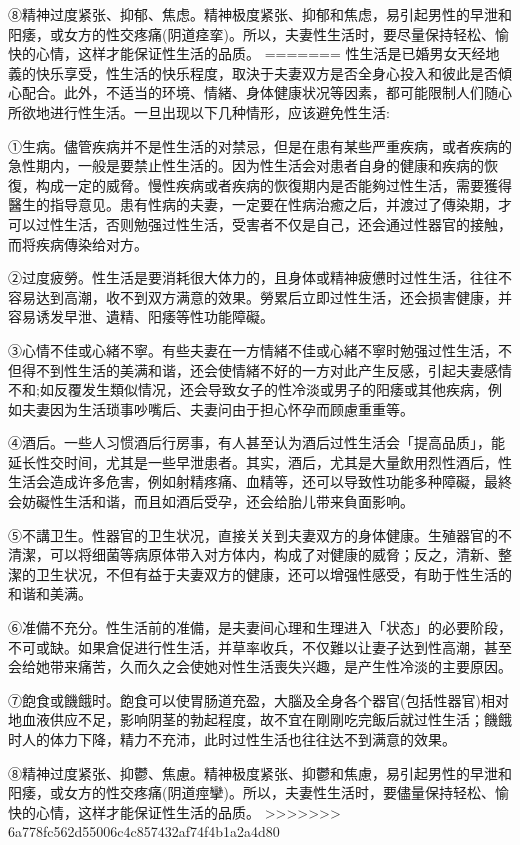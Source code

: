 \documentclass[12pt,UTF8]{ctexbook}
\begin{document}
⑧精神过度紧张、抑郁、焦虑。精神极度紧张、抑郁和焦虑，易引起男性的早泄和阳痿，或女方的性交疼痛(阴道痉挛)。所以，夫妻性生活时，要尽量保持轻松、愉快的心情，这样才能保证性生活的品质。
=======
性生活是已婚男女天经地義的快乐享受，性生活的快乐程度，取決于夫妻双方是否全身心投入和彼此是否傾心配合。此外，不适当的环境、情緒、身体健康状况等因素，都可能限制人们随心所欲地进行性生活。一旦出现以下几种情形，应该避免性生活:

①生病。儘管疾病并不是性生活的对禁忌，但是在患有某些严重疾病，或者疾病的急性期内，一般是要禁止性生活的。因为性生活会对患者自身的健康和疾病的恢復，构成一定的威脅。慢性疾病或者疾病的恢復期内是否能夠过性生活，需要獲得醫生的指导意见。患有性病的夫妻，一定要在性病治癒之后，并渡过了傳染期，才可以过性生活，否则勉强过性生活，受害者不仅是自己，还会通过性器官的接触，而将疾病傳染给对方。

②过度疲勞。性生活是要消耗很大体力的，且身体或精神疲憊时过性生活，往往不容易达到高潮，收不到双方满意的效果。勞累后立即过性生活，还会损害健康，并容易诱发早泄、遺精、阳痿等性功能障礙。

③心情不佳或心緒不寧。有些夫妻在一方情緒不佳或心緒不寧时勉强过性生活，不但得不到性生活的美满和谐，还会使情緒不好的一方对此产生反感，引起夫妻感情不和;如反覆发生類似情况，还会导致女子的性冷淡或男子的阳痿或其他疾病，例如夫妻因为生活琐事吵嘴后、夫妻问由于担心怀孕而顾慮重重等。

④酒后。一些人习惯酒后行房事，有人甚至认为酒后过性生活会「提高品质」，能延长性交时间，尤其是一些早泄患者。其实，酒后，尤其是大量飲用烈性酒后，性生活会造成许多危害，例如射精疼痛、血精等，还可以导致性功能多种障礙，最終会妨礙性生活和谐，而且如酒后受孕，还会给胎儿带来負面影响。

⑤不講卫生。性器官的卫生状况，直接关关到夫妻双方的身体健康。生殖器官的不清潔，可以将细菌等病原体带入对方体内，构成了对健康的威脅；反之，清新、整潔的卫生状况，不但有益于夫妻双方的健康，还可以增强性感受，有助于性生活的和谐和美满。

⑥准備不充分。性生活前的准備，是夫妻间心理和生理进入「状态」的必要阶段，不可或缺。如果倉促进行性生活，并草率收兵，不仅難以让妻子达到性高潮，甚至会给她带来痛苦，久而久之会使她对性生活喪失兴趣，是产生性冷淡的主要原因。

⑦飽食或饑餓时。飽食可以使胃肠道充盈，大腦及全身各个器官(包括性器官)相对地血液供应不足，影响阴茎的勃起程度，故不宜在剛剛吃完飯后就过性生活；饑餓时人的体力下降，精力不充沛，此时过性生活也往往达不到满意的效果。

⑧精神过度紧张、抑鬱、焦慮。精神极度紧张、抑鬱和焦慮，易引起男性的早泄和阳痿，或女方的性交疼痛(阴道痙攣)。所以，夫妻性生活时，要儘量保持轻松、愉快的心情，这样才能保证性生活的品质。
>>>>>>> 6a778fc562d55006c4c857432af74f4b1a2a4d80
\end{document}
